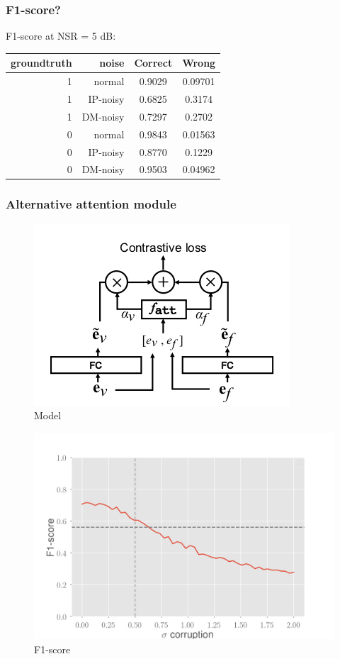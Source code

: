 \documentclass[10pt]{beamer}
\begin{document}
\begin{frame}
\frametitle{F1-score?}
F1-score at NSR = 5 dB:\\[0.7cm]
\centering
\begin{tabular}{@{}rr|cc@{}}\toprule
groundtruth&noise & Correct & Wrong \\ \midrule\midrule
1 &normal & 0.9029 & 0.09701 \\
1 &IP-noisy &  0.6825 & 0.3174\\
1 &DM-noisy & 0.7297 & 0.2702\\\midrule
0 &normal & 0.9843 & 0.01563 \\
0 &IP-noisy &  0.8770 & 0.1229\\
0 &DM-noisy & 0.9503 & 0.04962\\
\end{tabular}
 \end{frame}
 

\begin{frame}
\frametitle{Alternative attention module}
\begin{multicols}{2}
\begin{figure}
\centering
\vspace*{1cm}
\includegraphics[scale=0.3]{figs/noise-tolerant-t}
\vspace*{0.82cm}
\caption{Model}
\end{figure}
\columnbreak
\begin{figure}
\centering
\includegraphics[scale=0.2]{figs/other}
\caption{F1-score}
\end{figure}
\end{multicols}
\end{frame}

\end{document}
